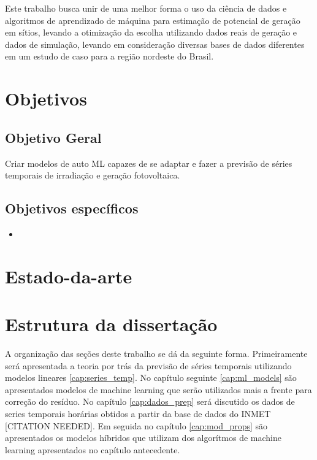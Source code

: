 Este trabalho busca unir de uma melhor forma o uso da ciência de dados e algoritmos de aprendizado de máquina para estimação de potencial de geração em sítios, levando a otimização da escolha utilizando dados reais de geração e dados de simulação, levando em consideração diversas bases de dados diferentes em um estudo de caso para a região nordeste do Brasil.


\section{Objetivos}

\subsection{Objetivo Geral}

Criar modelos de auto ML capazes de se adaptar e fazer a previsão de séries temporais de irradiação e geração fotovoltaica.

\subsection{Objetivos específicos}

\begin{itemize}
    \item 
\end{itemize}

\section{Estado-da-arte}


\section{Estrutura da dissertação}

A organização das seções deste trabalho se dá da seguinte forma. Primeiramente será apresentada a teoria por trás da previsão de séries temporais utilizando modelos lineares \ref{cap:series_temp}. No capítulo seguinte \ref{cap:ml_models} são apresentados modelos de machine learning que serão utilizados mais a frente para correção do resíduo.
No capítulo \ref{cap:dados_prep} será discutido os dados de series temporais horárias obtidos a partir da base de dados do INMET [CITATION NEEDED]. Em seguida no capítulo \ref{cap:mod_props} são apresentados os modelos híbridos que utilizam dos algorítmos de machine learning apresentados no capítulo antecedente.